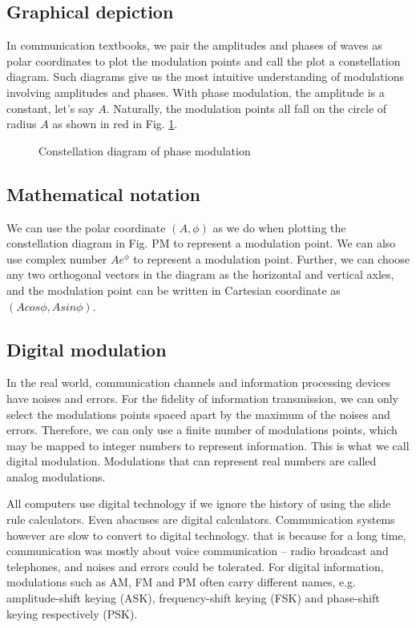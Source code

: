 \documentclass[Letter,11pt]{book}
\begin{document}
\subsection{Graphical depiction}
In communication textbooks, we pair the amplitudes and phases of waves as polar coordinates to plot the modulation points and call the plot a constellation diagram. Such diagrams give us the most intuitive understanding of modulations involving amplitudes and phases. With phase modulation, the amplitude is a constant, let's say $A$. Naturally, the modulation points all fall on the circle of radius $A$ as shown in red in Fig. \ref{PM}.

\begin{figure}[ht]\label{PM}

\caption{Constellation diagram of phase modulation}
\end{figure}

\subsection{Mathematical notation}
We can use the polar coordinate $(A, \phi)$ as we do when plotting the constellation diagram in Fig. {PM} to represent a modulation point. We can also use complex number $A e^\phi$ to represent a modulation point. Further, we can choose any two orthogonal vectors in the diagram as the horizontal and vertical axles, and the modulation point can be written in Cartesian coordinate as $(A cos\phi, A sin\phi)$.

\subsection{Digital modulation}
In the real world, communication channels and information processing devices have noises and errors. For the fidelity of information transmission, we can only select the modulations points spaced apart by the maximum of the noises and errors. Therefore, we can only use a finite number of modulations points, which may be mapped to integer numbers to represent information. This is what we call digital modulation. Modulations that can represent real numbers are called analog modulations.

All computers use digital technology if we ignore the history of using the slide rule calculators. Even abacuses are digital calculators. Communication systems however are slow to convert to digital technology. that is because for a long time, communication was mostly about voice communication -- radio broadcast and telephones, and noises and errors could be tolerated. For digital information, modulations such as AM, FM and PM often carry different names, e.g. amplitude-shift keying (ASK), frequency-shift keying (FSK) and phase-shift keying respectively (PSK).
\end{document}
